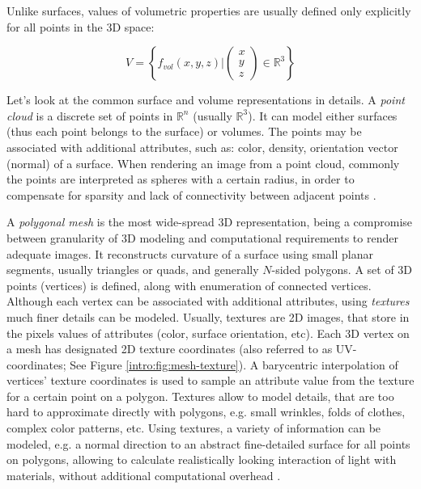 Unlike surfaces, values of volumetric properties are usually defined only explicitly for all points in the 3D space:

\begin{equation}
	\renewcommand\arraystretch{0.6}
	V = \left\{ f_{vol}(x,y,z)  \Bigg\rvert \begin{pmatrix} x \\ y \\ z \end{pmatrix} \in \mathbb{R}^3 \right\}
\end{equation}
  

Let's look at the common surface and volume representations in details. A \textit{point cloud} is a discrete set of points in $\mathbb{R}^n$ (usually $\mathbb{R}^3$). It can model either surfaces (thus each point belongs to the surface) or volumes. The points may be associated with additional attributes, such as: color, density, orientation vector (normal) of a surface. When rendering an image from a point cloud, commonly the points are interpreted as spheres with a certain radius, in order to compensate for sparsity and lack of connectivity between adjacent points \cite{aux:pointcloud21}.

A \textit{polygonal mesh} is the most wide-spread 3D representation, being a compromise between granularity of 3D modeling and computational requirements to render adequate images. It reconstructs curvature of a surface using small planar segments, usually triangles or quads, and generally $N$-sided polygons. A set of 3D points (vertices) is defined, along with enumeration of connected vertices. Although each vertex can be associated with additional attributes, using \textit{textures} much finer details can be modeled. Usually, textures are 2D images, that store in the pixels values of attributes (color, surface orientation, etc). Each 3D vertex on a mesh has designated 2D texture coordinates (also referred to as UV-coordinates; See Figure \ref{intro:fig:mesh-texture}). A barycentric interpolation of vertices' texture coordinates is used to sample an attribute value from the texture for a certain point on a polygon. Textures allow to model details, that are too hard to approximate directly with polygons, e.g. small wrinkles, folds of clothes, complex color patterns, etc. Using textures, a variety of information can be modeled, e.g. a normal direction to an abstract fine-detailed surface for all points on polygons, allowing to calculate realistically looking interaction of light with materials, without additional computational overhead \cite{aux:normal-mapping78}. 

